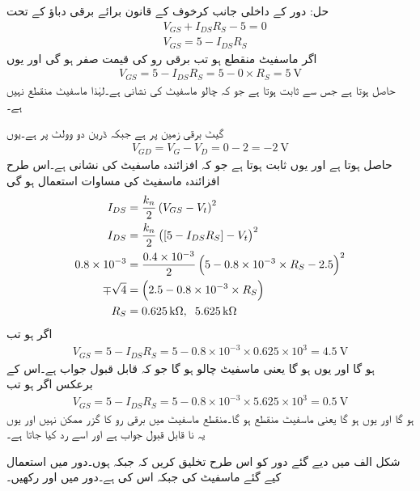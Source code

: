 حل:	دور کے داخلی جانب کرخوف کے قانون برائے برقی دباؤ کے تحت
\begin{align*}
& V_{GS}+I_{DS}R_S-5=0\\
& V_{GS}=5-I_{DS}R_S
\end{align*}
اگر ماسفیٹ منقطع ہو تب برقی رو کی قیمت صفر ہو گی اور یوں
\begin{align*}
V_{GS}=5-I_{DS}R_S=5-0 \times R_S =\SI{5}{\volt}
\end{align*}
حاصل ہوتا ہے جس سے   ثابت ہوتا ہے جو کہ چالو ماسفیٹ کی نشانی ہے۔لہٰذا ماسفیٹ منقطع نہیں ہے۔

گیٹ برقی زمین پر ہے جبکہ ڈرین دو وولٹ پر ہے۔یوں
\begin{align*}
V_{GD}=V_{G}-V_{D}=0-2=\SI{-2}{\volt}
\end{align*}
حاصل ہوتا ہے اور یوں  ثابت ہوتا ہے جو کہ افزائندہ ماسفیٹ کی نشانی ہے۔اس طرح افزائندہ ماسفیٹ کی مساوات استعمال ہو گی
\begin{align*}
I_{DS}&=\frac{k_n}{2} \left(V_{GS}-V_t \right )^{2}\\
I_{DS}&=\frac{k_n}{2} \left([5-I_{DS}R_S]-V_t \right )^{2}\\
0.8 \times 10^{-3}&=\frac{0.4 \times 10^{-3}}{2} \left(5-0.8 \times 10^{-3} \times R_S-2.5 \right )^{2}\\
\mp \sqrt{4}&=\left(2.5-0.8 \times 10^{-3} \times R_S \right )\\
R_S&=\SI{0.625}{\kilo \ohm},\hspace{2mm} \SI{5.625}{\kilo \ohm}
\end{align*}
اگر  ہو تب
\begin{align*}
V_{GS}=5-I_{DS}R_S=5-0.8 \times 10^{-3} \times 0.625 \times 10^{3}=\SI{4.5}{\volt}
\end{align*}
ہو گا اور یوں  ہو گا یعنی ماسفیٹ چالو ہو گا جو کہ قابل قبول جواب ہے۔اس کے برعکس اگر  
ہو تب
\begin{align*}
V_{GS}=5-I_{DS}R_S=5-0.8 \times 10^{-3} \times 5.625 \times 10^3 =\SI{0.5}{\volt}
\end{align*}
ہو گا اور یوں  ہو گا یعنی ماسفیٹ منقطع ہو گا۔منقطع ماسفیٹ میں برقی رو کا گزر ممکن نہیں اور یوں یہ نا قابل قبول جواب ہے اور اسے رد کیا جاتا ہے۔


شکل  الف میں دیے گئے دور کو اس طرح تخلیق کریں کہ   جبکہ  ہوں۔دور میں استعمال کیے گئے ماسفیٹ کی   جبکہ اس کی   ہے۔دور میں  اور  رکھیں۔

